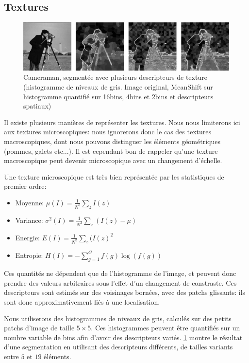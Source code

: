 \documentclass{article}
\begin{document}
\subsection{Textures}

\begin{figure}
\label{bins}
\includegraphics[width=500px]{images/cameraman.png}
\caption{Cameraman, segmentée avec plusieurs descripteurs de texture
(histogramme de niveaux de gris. Image original, MeanShift sur histogramme 
quantifié sur 16bins, 4bins et 2bins et descripteurs spatiaux)}
\end{figure}

Il existe plusieurs manières de représenter les textures. Nous nous limiterons
ici aux textures microscopiques: nous ignorerons donc le cas des textures
macroscopiques, dont nous pouvons distinguer les éléments géométriques
(pommes, galets etc...). Il est cependant bon de rappeler qu'une texture
macroscopique peut devenir microscopique avec un changement d'échelle.

Une texture microscopique est très bien représentée par les statistiques de
premier ordre:
\begin{itemize}
\item Moyenne: $\mu(I) = \frac{1}{N^2} \sum_z I(z)$
\item Variance: $\sigma^2(I) = \frac{1}{N^2} \sum_z (I(z) - \mu)$
\item Energie: $E(I) = \frac{1}{N^2} \sum_z (I(z)^2$
\item Entropie: $H(I) = - \sum_{g = 1}^G f(g) \log(f(g))$
\end{itemize}

Ces quantités ne dépendent que de l'histogramme de l'image, et peuvent donc
prendre des valeurs arbitraires sous l'effet d'un changement de constraste.
Ces descripteurs  sont estimés sur des voisinages bornées, avec des patchs
glissants: ils sont donc approximativement liés à une localisation.

Nous utiliserons des histogrammes de niveaux de gris, calculés sur des petits
patchs d'image de taille $5 \times 5$. Ces histogrammes peuvent être
quantifiés sur un nombre variable de bins afin d'avoir des descripteurs
variés. \ref{bins} montre le résultat d'une segmentation en utilisant des
descripteurs différents, de tailles variants entre $5$ et $19$ éléments.
\end{document}
